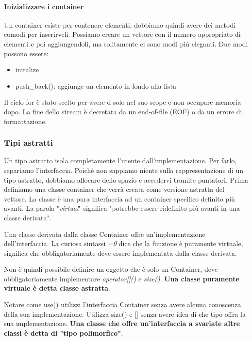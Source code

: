 \documentclass[11pt,a4paper]{book}
\begin{document}
\paragraph{Inizializzare i container}
Un container esiste per contenere elementi, dobbiamo quindi avere dei metodi comodi per inserirveli. Possiamo creare un vettore con il numero appropriato di elementi e poi aggiungendoli, ma solitamente ci sono modi più eleganti.
Due modi possono essere:
\begin{itemize}
	\item initalize
	\item push\_back(): aggiunge un elemento in fondo alla lista
\end{itemize}

\label{code: 026}

Il ciclo for è stato scelto per avere d solo nel suo scope e non occupare memoria dopo. La fine dello stream è decretata da un end-of-file (EOF) o da un errore di formattazione.

\subsubsection{Tipi astratti}
Un tipo astratto isola completamente l'utente dall'implementazione. Per farlo, separiamo l'interfaccia. Poichè non sappiamo niente sulla rappresentazione di un tipo astratto, dobbiamo allocare dello spazio e accedervi tramite puntatori. Prima definiamo una classe container che verrà creata come versione astratta del vettore.
\label{code: 027}
La classe è una pura interfaccia ad un container specifico definito più avanti. La parola "\emph{virtual}" significa "potrebbe essere ridefinito più avanti in una classe derivata".

Una classe derivata dalla classe Container offre un'implementazione dell'interfaccia. La curiosa sintassi \emph{=0} dice che la funzione è puramente virtuale, significa che obbligatoriamente deve essere implementata dalla classe derivata.

Non è quindi possibile definire un oggetto che è solo un Container, deve obbligatoriamente implementare \emph{operator[]()} e \emph{size()}. \textbf{Una classe puramente virtuale è detta classe astratta}.
\label{code: 028}

Notare come use() utilizzi l'interfaccia Container senza avere alcuna conoscenza della sua implementazione. Utilizza size() e [] senza avere idea di che tipo offra la sua implementazione. \textbf{Una classe che offre un'interfaccia a svariate altre classi è detta di "tipo polimorfico"}.
\end{document}
